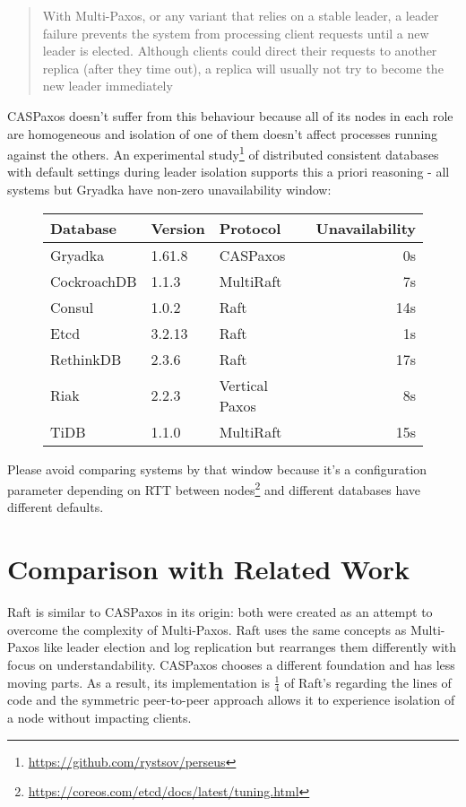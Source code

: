 \documentclass[12pt]{article}
\theoremstyle{definition}
\begin{document}
\begin{quote}
  With Multi-Paxos, or any variant that relies on a stable leader, a leader failure prevents the system from processing client requests until a new leader is elected. Although clients could direct their requests to another replica (after they time out), a replica will usually not try to become the new leader immediately
\end{quote}

CASPaxos doesn't suffer from this behaviour because all of its nodes in each role are homogeneous and isolation of one of them doesn't affect processes running against the others. An experimental study\footnote{\href{https://github.com/rystsov/perseus}{https://github.com/rystsov/perseus}} of distributed consistent databases with default settings during leader isolation supports this a priori reasoning - all systems but Gryadka have non-zero unavailability window:

\begin{figure}[!h]
  \centering
  \begin{tabular}{|l|l|l|r|}
  \hline
  Database & Version & Protocol & Unavailability\\
  \hline
  \hline
  Gryadka & 1.61.8 & CASPaxos & 0s\\
  \hline
  CockroachDB & 1.1.3 & MultiRaft & 7s\\
  Consul & 1.0.2 & Raft & 14s\\
  Etcd & 3.2.13 & Raft & 1s\\
  RethinkDB & 2.3.6 & Raft & 17s\\
  Riak & 2.2.3 & Vertical Paxos & 8s\\
  TiDB & 1.1.0 & MultiRaft & 15s\\
  \hline
  \end{tabular}
\end{figure}

Please avoid comparing systems by that window because it's a configuration parameter depending on RTT between nodes\footnote{\href{https://coreos.com/etcd/docs/latest/tuning.html}{https://coreos.com/etcd/docs/latest/tuning.html}} and different databases have different defaults.

\section{Comparison with Related Work}

Raft\cite{raft} is similar to CASPaxos in its origin: both were created as an attempt to overcome the complexity of Multi-Paxos. Raft uses the same concepts as Multi-Paxos like leader election and log replication but rearranges them differently with focus on understandability. CASPaxos chooses a different foundation and has less moving parts. As a result, its implementation is $\frac{1}{4}$ of Raft's regarding the lines of code and the symmetric peer-to-peer approach allows it to experience isolation of a node without impacting clients.
\end{document}
